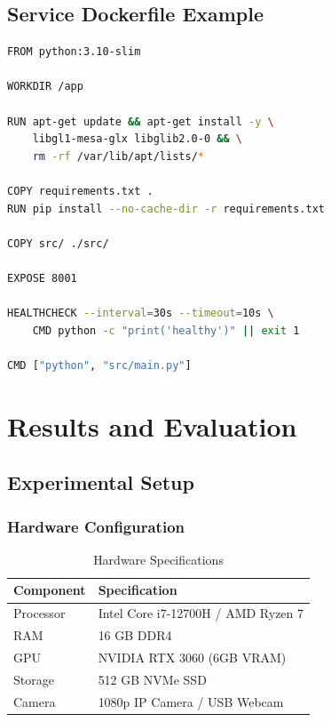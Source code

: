 \documentclass[12pt,a4paper]{report}
\begin{document}
\section{Service Dockerfile Example}

\begin{lstlisting}[language=bash, caption=Detection Service Dockerfile]
FROM python:3.10-slim

WORKDIR /app

RUN apt-get update && apt-get install -y \
    libgl1-mesa-glx libglib2.0-0 && \
    rm -rf /var/lib/apt/lists/*

COPY requirements.txt .
RUN pip install --no-cache-dir -r requirements.txt

COPY src/ ./src/

EXPOSE 8001

HEALTHCHECK --interval=30s --timeout=10s \
    CMD python -c "print('healthy')" || exit 1

CMD ["python", "src/main.py"]
\end{lstlisting}


\chapter{Results and Evaluation}

\section{Experimental Setup}

\subsection{Hardware Configuration}
\begin{table}[H]
\centering
\caption{Hardware Specifications}
\begin{tabular}{|l|l|}
\hline
\textbf{Component} & \textbf{Specification} \\
\hline
Processor & Intel Core i7-12700H / AMD Ryzen 7 \\
\hline
RAM & 16 GB DDR4 \\
\hline
GPU & NVIDIA RTX 3060 (6GB VRAM) \\
\hline
Storage & 512 GB NVMe SSD \\
\hline
Camera & 1080p IP Camera / USB Webcam \\
\hline
\end{tabular}
\end{table}
\end{document}
